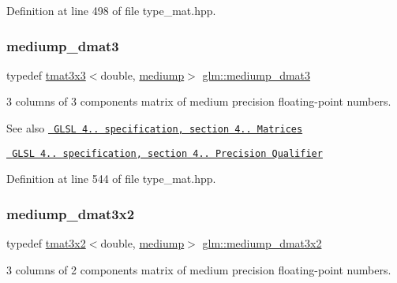 Definition at line 498 of file type\+\_\+mat.\+hpp.

\mbox{\label{group__core__precision_ga1a9a878d256cbb899a9c10bc7332995a}} 
\subsubsection{\texorpdfstring{mediump\_dmat3}{mediump\_dmat3}}
{\footnotesize\ttfamily typedef \mbox{\hyperlink{structglm_1_1tmat3x3}{tmat3x3}}$<$double, \mbox{\hyperlink{namespaceglm_a0f04f086094c747d227af4425893f545a6416f3ea0c9025fb21ed50c4d6620482}{mediump}}$>$ \mbox{\hyperlink{group__core__precision_ga1a9a878d256cbb899a9c10bc7332995a}{glm\+::mediump\+\_\+dmat3}}}

3 columns of 3 components matrix of medium precision floating-\/point numbers.

\begin{DoxySeeAlso}{See also}
\href{http://www.opengl.org/registry/doc/GLSLangSpec.4.20.8.pdf}{\texttt{ G\+L\+SL 4.. specification, section 4.. Matrices}} 

\href{http://www.opengl.org/registry/doc/GLSLangSpec.4.20.8.pdf}{\texttt{ G\+L\+SL 4.. specification, section 4.. Precision Qualifier}} 
\end{DoxySeeAlso}


Definition at line 544 of file type\+\_\+mat.\+hpp.

\mbox{\label{group__core__precision_ga5ad217fad4f08abe72401409595076f2}} 
\subsubsection{\texorpdfstring{mediump\_dmat3x2}{mediump\_dmat3x2}}
{\footnotesize\ttfamily typedef \mbox{\hyperlink{structglm_1_1tmat3x2}{tmat3x2}}$<$double, \mbox{\hyperlink{namespaceglm_a0f04f086094c747d227af4425893f545a6416f3ea0c9025fb21ed50c4d6620482}{mediump}}$>$ \mbox{\hyperlink{group__core__precision_ga5ad217fad4f08abe72401409595076f2}{glm\+::mediump\+\_\+dmat3x2}}}

3 columns of 2 components matrix of medium precision floating-\/point numbers.

